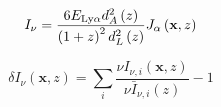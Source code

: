 \begin{equation}
  I_{\nu} = \frac{6 E_{\rm Ly\alpha} d_A^2 \left(z \right)}{\left( 1 + z\right)^2 d_{L}^2 \left( z \right)} J_{\alpha} \left( \textbf{x}, z \right)
\end{equation}


\begin{equation}
  \delta I_{\nu} \left(\textbf{x}, z \right) = \sum_i \frac{\nu I_{\nu, i} \left(\textbf{x}, z \right)}{\nu \bar{I}_{\nu, i} \left(z \right)} - 1
\end{equation}
